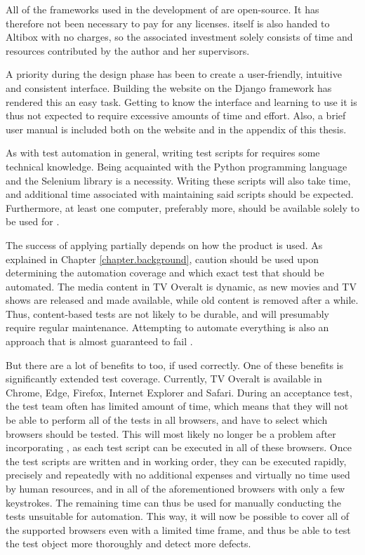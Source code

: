 All of the frameworks used in the development of \toolname \space are open-source. It has therefore not been necessary to pay for any licenses. \toolname \space itself is also handed to Altibox with no charges, so the associated investment solely consists of time and resources contributed by the author and her supervisors.

A priority during the design phase has been to create a user-friendly, intuitive and consistent interface. Building the website on the Django framework has rendered this an easy task. Getting to know the interface and learning to use it is thus not expected to require excessive amounts of time and effort. Also, a brief user manual is included both on the website and in the appendix of this thesis.

As with test automation in general, writing test scripts for \toolname \space requires some technical knowledge. Being acquainted with the Python programming language and the Selenium library is a necessity. Writing these scripts will also take time, and additional time associated with maintaining said scripts should be expected. Furthermore, at least one computer, preferably more, should be available solely to be used for \toolname.

The success of applying \toolname \space partially depends on how the product is used. As explained in Chapter \ref{chapter.background}, caution should be used upon determining the automation coverage and which exact test that should be automated. The media content in TV Overalt is dynamic, as new movies and TV shows are released and made available, while old content is removed after a while. Thus, content-based tests are not likely to be durable, and will presumably require regular maintenance. Attempting to automate everything is also an approach that is almost guaranteed to fail \cite{ksljdf}.

But there are a lot of benefits to \toolname \space too, if used correctly. One of these benefits is significantly extended test coverage. Currently, TV Overalt is available in Chrome, Edge, Firefox, Internet Explorer and Safari. During an acceptance test, the test team often has limited amount of time, which means that they will not be able to perform all of the tests in all browsers, and have to select which browsers should be tested. This will most likely no longer be a problem after incorporating \toolname, as each test script can be executed in all of these browsers. Once the test scripts are written and in working order, they can be executed rapidly, precisely and repeatedly with no additional expenses and virtually no time used by human resources, and in  all of the aforementioned browsers with only a few keystrokes. The remaining time can thus be used for manually conducting the tests unsuitable for automation. This way, it will now be possible to cover all of the supported browsers even with a limited time frame, and thus be able to test the test object more thoroughly and detect more defects.

